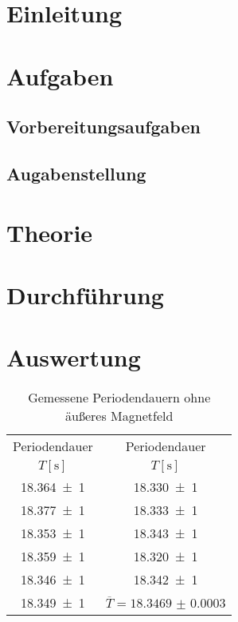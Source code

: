 



  \section{Einleitung}
  
  
  
  \section{Aufgaben}
  
  
  
    \subsection{Vorbereitungsaufgaben}
    
    
    
    \subsection{Augabenstellung}
    
    
    
  \section{Theorie}
  
  
  
  \section{Durchführung}
  
  
  
  \section{Auswertung}
   
  

    
    
      \begin{table}[h]
        \begin{tabular}{|C||C|}
          \hline
          Periodendauer & Periodendauer \\ 
          $T[\si{\second}]$ & $T[\si{\second}]$\\
          \hline \hline
          \num{18,364(1)} & \num{18,330(1)}\\ \hline   
          \num{18,377(1)} & \num{18,333(1)}\\ \hline 
          \num{18,353(1)} & \num{18,343(1)}\\ \hline  
          \num{18,359(1)} & \num{18,320(1)}\\ \hline  
          \num{18,346(1)} & \num{18,342(1)}\\ \hline  
          \num{18,349(1)} & $\overline{T} = \num{18.3469(3)}$\\ \hline
    
    
        \end{tabular}
        \centering
        \caption{Gemessene Periodendauern ohne äußeres Magnetfeld}
        \label{Tab1}
      \end{table}
      

